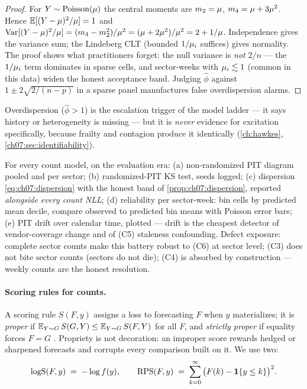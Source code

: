 \begin{proof}
For $Y\sim\mathrm{Poisson}(\mu)$ the central moments are
$m_2=\mu$, $m_4=\mu+3\mu^2$. Hence
$\mathbb{E}[(Y-\mu)^2/\mu]=1$ and
$\operatorname{Var}[(Y-\mu)^2/\mu] = (m_4-m_2^2)/\mu^2
 = (\mu+2\mu^2)/\mu^2 = 2 + 1/\mu$. Independence gives the variance
sum; the Lindeberg CLT (bounded $1/\mu_i$ suffices) gives normality.
The proof shows what practitioners forget: the null variance is
\emph{not} $2/n$ --- the $1/\mu_i$ term dominates in sparse cells, and
sector-weeks with $\mu_i \lesssim 1$ (common in this data) widen the
honest acceptance band. Judging $\hat\phi$ against
$1 \pm 2\sqrt{2/(n-p)}$ in a sparse panel manufactures false
overdispersion alarms.
\end{proof}

Overdispersion ($\hat\phi>1$) is the escalation trigger of the model
ladder --- it says history or heterogeneity is missing --- but it is
\emph{never} evidence for excitation specifically, because frailty and
contagion produce it identically (\cref{ch:hawkes},
\cref{ch07:sec:identifiability}).

\begin{protocol}\label{prot:ch07:pit}
For every count model, on the evaluation era: (a) non-randomized PIT
diagram pooled and per sector; (b) randomized-PIT KS test, seeds logged;
(c) dispersion \cref{eq:ch07:dispersion} with the honest band of
\cref{prop:ch07:dispersion}, reported \emph{alongside every count NLL};
(d) reliability per sector-week: bin cells by predicted mean decile,
compare observed to predicted bin means with Poisson error bars;
(e) PIT drift over calendar time, plotted --- drift is the cheapest
detector of vendor-coverage change and of (C5) staleness confounding.
Defect exposure: complete sector counts make this battery robust to (C6)
at sector level; (C3) does not bite sector counts (sectors do not die);
(C4) is absorbed by construction --- weekly counts are the honest
resolution.
\end{protocol}

\paragraph{Scoring rules for counts.}
A scoring rule $S(F,y)$ assigns a loss to forecasting $F$ when $y$
materializes; it is \emph{proper} if $\mathbb{E}_{Y\sim G}\,S(G,Y) \le
\mathbb{E}_{Y\sim G}\,S(F,Y)$ for all $F$, and \emph{strictly proper} if equality
forces $F=G$ \citep{gneitingraftery2007}. Propriety is not decoration: an
improper score rewards hedged or sharpened forecasts and corrupts every
comparison built on it. We use two:
\begin{equation}\label{eq:ch07:scores}
\mathrm{logS}(F,y) \;=\; -\log f(y),
\qquad
\mathrm{RPS}(F,y) \;=\; \sum_{k=0}^{\infty}\big(F(k) - \mathbf{1}\{y\le k\}\big)^2 .
\end{equation}

